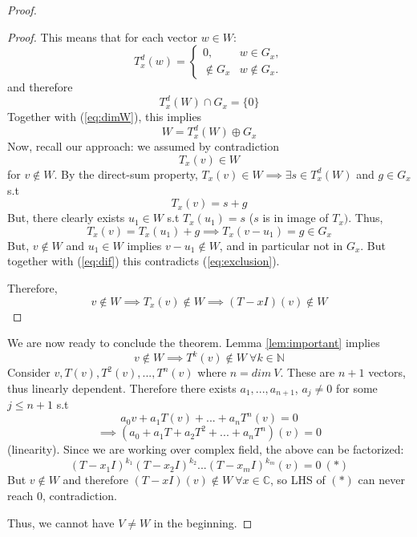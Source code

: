 \documentclass{article}
\theoremstyle{definition}
\begin{document}
\begin{proof}
\begin{proof}
This means that for each vector $w\in W$:
\begin{equation}
    T_x^d(w)=\begin{cases}
0, & w\in G_x,\\
\notin G_x & w\notin G_x.
\end{cases}
\end{equation}
and therefore $$T_x^d(W)\cap G_x=\{0\}$$
Together with (\ref{eq:dimW}), this implies
$$W=T_x^d(W) \oplus G_x$$
Now, recall our approach: we assumed by contradiction $$T_x(v)\in W$$for $v\notin W.$ By the direct-sum property, $T_x(v)\in W \implies \exists s\in T_x^d(W)$ and $g\in G_x$ s.t
$$T_x(v)=s+g$$
But, there clearly exists $u_1\in W$ s.t $T_x(u_1)=s$ ($s$ is in image of $T_x)$.
Thus, 
\begin{equation}
    \label{eq:dif}
    T_x(v)=T_x(u_1)+g\implies T_x(v-u_1)=g\in G_x
\end{equation}
But, $v\notin W$ and $u_1\in W$ implies $v-u_1\notin W$, and in particular not in $G_x$.
But together with (\ref{eq:dif}) this contradicts (\ref{eq:exclusion}).

Therefore, $$v\notin W\implies T_x(v)\notin W\implies (T-xI)(v)\notin W$$
\end{proof}


We are now ready to conclude the theorem. Lemma \ref{lem:important} implies $$v\notin  W\implies T^k(v)\notin W\ \forall k\in \mathbb{N}$$Consider $v,T(v),T^2(v),...,T^n(v)$ where $n=dim\ V$. These are $n+1$ vectors, thus linearly dependent. Therefore there exists $a_1,...,a_{n+1}$, $a_j\neq 0$ for some $j\leq n+1$ s.t $$a_0v+a_1T(v)+...+a_nT^n(v)=0$$ $$\implies(a_0+a_1T+a_2T^2+...+a_nT^n)(v)=0$$(linearity). Since we are working over complex field, the above can be factorized: $$(T-x_1I)^{k_1} (T-x_2I)^{k_2}...(T-x_mI)^{k_m}(v)=0\ (*)$$But $v\notin W$ and therefore $(T-xI)(v)\notin W\ \forall x\in \mathbb{C}$, so LHS of $(*)$ can never reach $0$, contradiction. 

Thus, we cannot have $V\neq W$ in the beginning.

\end{proof}

    
    






























 
\end{document}

